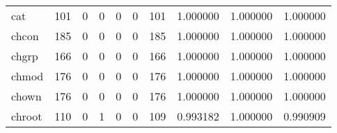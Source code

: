 \begin{longtable}{lrrrrrrrrr}
cat       &                                   101 &                                                  0 &                                                  0 &                                                  0 &                                                  0 &                                                101 &                                           1.000000 &                               1.000000 &                             1.000000 \\
chcon     &                                   185 &                                                  0 &                                                  0 &                                                  0 &                                                  0 &                                                185 &                                           1.000000 &                               1.000000 &                             1.000000 \\
chgrp     &                                   166 &                                                  0 &                                                  0 &                                                  0 &                                                  0 &                                                166 &                                           1.000000 &                               1.000000 &                             1.000000 \\
chmod     &                                   176 &                                                  0 &                                                  0 &                                                  0 &                                                  0 &                                                176 &                                           1.000000 &                               1.000000 &                             1.000000 \\
chown     &                                   176 &                                                  0 &                                                  0 &                                                  0 &                                                  0 &                                                176 &                                           1.000000 &                               1.000000 &                             1.000000 \\
chroot    &                                   110 &                                                  0 &                                                  1 &                                                  0 &                                                  0 &                                                109 &                                           0.993182 &                               1.000000 &                             0.990909 \\

\end{longtable}
